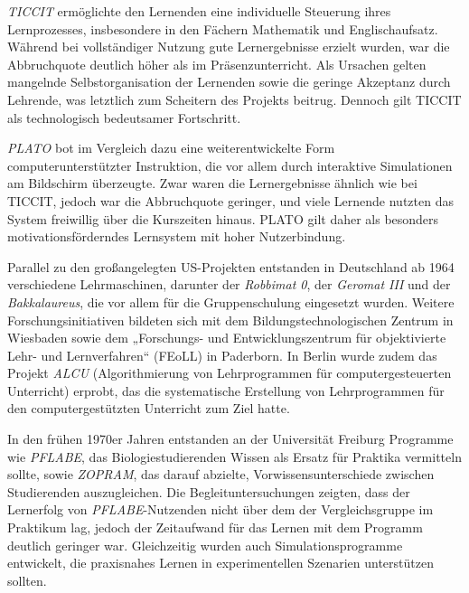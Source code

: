 \textit{TICCIT} ermöglichte den Lernenden eine individuelle Steuerung ihres Lernprozesses, insbesondere in den Fächern Mathematik und Englischaufsatz. Während bei vollständiger Nutzung gute Lernergebnisse erzielt wurden, war die Abbruchquote deutlich höher als im Präsenzunterricht. Als Ursachen gelten mangelnde Selbstorganisation der Lernenden sowie die geringe Akzeptanz durch Lehrende, was letztlich zum Scheitern des Projekts beitrug. Dennoch gilt TICCIT als technologisch bedeutsamer Fortschritt.\parencite[S.~71]{oshea_lernen_1986}\parencite[S.~13]{schonfeld_computerbasiertes_2006}

\textit{PLATO} bot im Vergleich dazu eine weiterentwickelte Form computerunterstützter Instruktion, die vor allem durch interaktive Simulationen am Bildschirm überzeugte. Zwar waren die Lernergebnisse ähnlich wie bei TICCIT, jedoch war die Abbruchquote geringer, und viele Lernende nutzten das System freiwillig über die Kurszeiten hinaus. PLATO gilt daher als besonders motivationsförderndes Lernsystem mit hoher Nutzerbindung.\parencite[S.~75f]{oshea_lernen_1986}\parencite[S.~14]{schonfeld_computerbasiertes_2006}


Parallel zu den großangelegten US-Projekten entstanden in Deutschland ab 1964 verschiedene Lehrmaschinen, darunter der \textit{Robbimat 0}, der \textit{Geromat III} und der \textit{Bakkalaureus}, die vor allem für die Gruppenschulung eingesetzt wurden. Weitere Forschungsinitiativen bildeten sich mit dem Bildungstechnologischen Zentrum in Wiesbaden sowie dem „Forschungs- und Entwicklungszentrum für objektivierte Lehr- und Lernverfahren“ (FEoLL) in Paderborn. In Berlin wurde zudem das Projekt \textit{ALCU} (Algorithmierung von Lehrprogrammen für computergesteuerten Unterricht) erprobt, das die systematische Erstellung von Lehrprogrammen für den computergestützten Unterricht zum Ziel hatte.\parencite[S.~10]{niegemann_kompendium_2008}\parencite[S.~11]{schonfeld_computerbasiertes_2006}

In den frühen 1970er Jahren entstanden an der Universität Freiburg Programme wie \textit{PFLABE}, das Biologiestudierenden Wissen als Ersatz für Praktika vermitteln sollte, sowie \textit{ZOPRAM}, das darauf abzielte, Vorwissensunterschiede zwischen Studierenden auszugleichen. Die Begleituntersuchungen zeigten, dass der Lernerfolg von \textit{PFLABE}-Nutzenden nicht über dem der Vergleichsgruppe im Praktikum lag, jedoch der Zeitaufwand für das Lernen mit dem Programm deutlich geringer war. Gleichzeitig wurden auch Simulationsprogramme entwickelt, die praxisnahes Lernen in experimentellen Szenarien unterstützen sollten.\parencite[S.~11]{niegemann_kompendium_2008}


